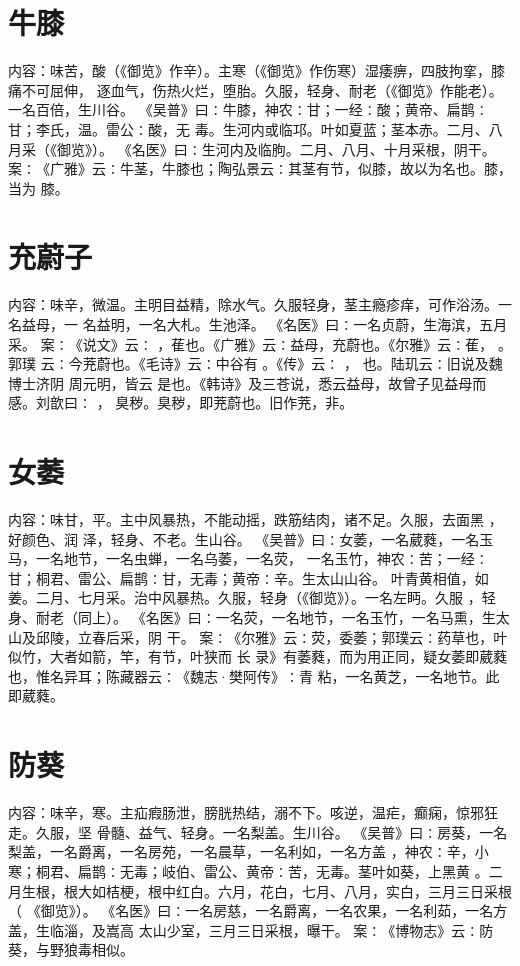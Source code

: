 \documentclass[12pt,UTF8]{ctexbook}
\begin{document}
\section{牛膝}
内容：味苦，酸（《御览》作辛）。主寒（《御览》作伤寒）湿痿痹，四肢拘挛，膝痛不可屈伸， 
逐血气，伤热火烂，堕胎。久服，轻身、耐老（《御览》作能老）。一名百倍，生川谷。 
《吴普》曰∶牛膝，神农∶甘；一经∶酸；黄帝、扁鹊∶甘；李氏，温。雷公∶酸，无 
毒。生河内或临邛。叶如夏蓝；茎本赤。二月、八月采（《御览》）。 
《名医》曰∶生河内及临朐。二月、八月、十月采根，阴干。 
案∶《广雅》云∶牛茎，牛膝也；陶弘景云∶其茎有节，似膝，故以为名也。膝，当为 
膝。 


\section{充蔚子}
内容：味辛，微温。主明目益精，除水气。久服轻身，茎主瘾疹痒，可作浴汤。一名益母，一 
名益明，一名大札。生池泽。 
《名医》曰∶一名贞蔚，生海滨，五月采。 
案∶《说文》云∶ ，萑也。《广雅》云∶益母，充蔚也。《尔雅》云∶萑， 。郭璞 
云∶今茺蔚也。《毛诗》云∶中谷有 。《传》云∶ ， 也。陆玑云∶旧说及魏博士济阴 
周元明，皆云 是也。《韩诗》及三苍说，悉云益母，故曾子见益母而感。刘歆曰∶ ， 
臭秽。臭秽，即茺蔚也。旧作茺，非。 


\section{女萎}
内容：味甘，平。主中风暴热，不能动摇，跌筋结肉，诸不足。久服，去面黑 ，好颜色、润 
泽，轻身、不老。生山谷。 
《吴普》曰∶女萎，一名葳蕤，一名玉马，一名地节，一名虫蝉，一名乌萎，一名荧， 
一名玉竹，神农∶苦；一经∶甘；桐君、雷公、扁鹊∶甘，无毒；黄帝∶辛。生太山山谷。 
叶青黄相值，如姜。二月、七月采。治中风暴热。久服，轻身（《御览》）。一名左眄。久服 
，轻身、耐老（同上）。 
《名医》曰∶一名荧，一名地节，一名玉竹，一名马熏，生太山及邱陵，立春后采，阴 
干。 
案∶《尔雅》云∶荧，委萎；郭璞云∶药草也，叶似竹，大者如箭，竿，有节，叶狭而 
长 
录》有萎蕤，而为用正同，疑女萎即葳蕤也，惟名异耳；陈藏器云∶《魏志·樊阿传》∶青 
粘，一名黄芝，一名地节。此即葳蕤。 


\section{防葵}
内容：味辛，寒。主疝瘕肠泄，膀胱热结，溺不下。咳逆，温疟，癫痫，惊邪狂走。久服，坚 
骨髓、益气、轻身。一名梨盖。生川谷。 
《吴普》曰∶房葵，一名梨盖，一名爵离，一名房苑，一名晨草，一名利如，一名方盖 
，神农∶辛，小寒；桐君、扁鹊∶无毒；岐伯、雷公、黄帝∶苦，无毒。茎叶如葵，上黑黄 
。二月生根，根大如桔梗，根中红白。六月，花白，七月、八月，实白，三月三日采根（ 
《御览》）。 
《名医》曰∶一名房慈，一名爵离，一名农果，一名利茹，一名方盖，生临淄，及嵩高 
太山少室，三月三日采根，曝干。 
案∶《博物志》云∶防葵，与野狼毒相似。 
\end{document}
